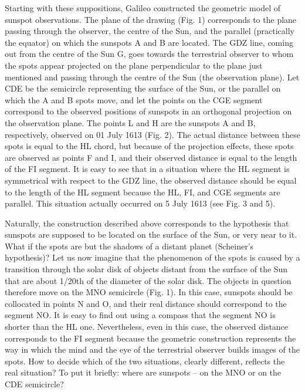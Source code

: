 \begin{artengenv}
Starting with these suppositions, Galileo constructed the geometric model of sunspot observations. The plane of the
drawing (Fig. 1) corresponds to the plane passing through the observer, the centre of the Sun, and the parallel
(practically the equator) on which the sunspots A and B are located. The GDZ line, coming out from the centre of the
Sun G, goes towards the terrestrial observer to whom the spots appear projected on the plane perpendicular to the plane
just mentioned and passing through the centre of the Sun (the observation plane). Let CDE be the semicircle
representing the surface of the Sun, or the parallel on which the A and B spots move, and let the points on the CGE
segment correspond to the observed positions of sunspots in an orthogonal projection on the observation plane. The
points L and H are the sunspots A and B, respectively, observed on 01 July 1613 (Fig. 2). The actual distance between
these spots is equal to the HL chord, but because of the projection effects, these spots are observed as points F and
I, and their observed distance is equal to the length of the FI segment. It is easy to see that in a situation where
the HL segment is symmetrical with respect to the GDZ line, the observed distance should be equal to the length of the
HL segment because the HL, FI, and CGE segments are parallel. This situation actually occurred on 5 July 1613 (see Fig.
3 and 5).

Naturally, the construction described above corresponds to the hypothesis that sunspots are supposed to be located on
the surface of the Sun, or very near to it. What if the spots are but the shadows of a distant planet (Scheiner’s
hypothesis)? Let us now imagine that the phenomenon of the spots is caused by a transition through the solar disk of
objects distant from the surface of the Sun that are about 1/20th of the diameter of the solar disk. The objects in
question therefore move on the MNO semicircle (Fig. 1). In this case, sunspots should be collocated in points N and O,
and their real distance should correspond to the segment NO. It is easy to find out using a compass that the segment NO
is shorter than the HL one. Nevertheless, even in this case, the observed distance corresponds to the FI segment
because the geometric construction represents the way in which the mind and the eye of the terrestrial observer builds
images of the spots. How to decide which of the two situations, clearly different, reflects the real situation? To put
it briefly: where are sunspots -- on the MNO or on the CDE semicircle?


\end{artengenv}
